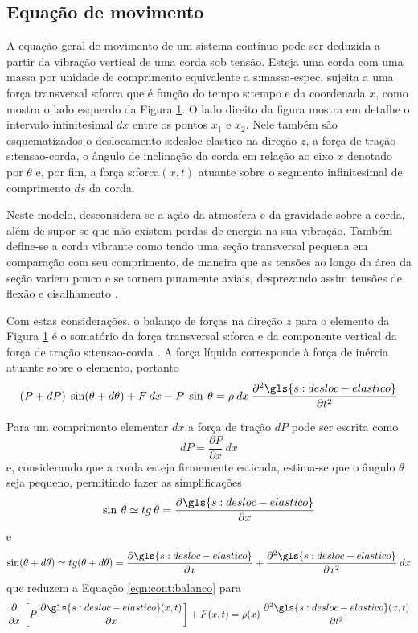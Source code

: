 \documentclass[12pt,oneside,english,brazil,lmodern,siglas,simbolos,cite=num]{ucsmonograph}
\begin{document}
	\subsection{Equação de movimento}
	A equação geral de movimento de um sistema contínuo pode ser deduzida a partir da vibração vertical de uma corda sob tensão.
	Esteja uma corda com uma massa por unidade de comprimento equivalente a \gls{s:massa-espec}, sujeita a uma força transversal \gls{s:forca} que é função do tempo \gls{s:tempo} e da coordenada $x$, como mostra o lado esquerdo da Figura \ref{fig:vibracao-corda}.
	O lado direito da figura mostra em detalhe o intervalo infinitesimal $dx$ entre os pontos $x_1$ e $x_2$.
	Nele também são esquematizados o deslocamento \gls{s:desloc-elastico} na direção $z$, a força de tração \gls{s:tensao-corda}, o ângulo de inclinação da corda em relação ao eixo $x$ denotado por $ \theta $ e, por fim, a força \gls{s:forca}$(x,t)$ atuante sobre o segmento infinitesimal de comprimento $ds$ da corda.
	\begin{figure}[t] 
	 \label{fig:vibracao-corda}
	\end{figure}

	Neste modelo, desconsidera-se a ação da atmosfera e da gravidade sobre a corda, além de supor-se que não existem perdas de energia na sua vibração.
	Também define-se a corda vibrante como tendo uma seção transversal pequena em comparação com seu comprimento, de maneira que as tensões ao longo da área da seção variem pouco e se tornem puramente axiais, desprezando assim tensões de flexão e cisalhamento \cite{clark:1972}.
	
	Com estas considerações, o balanço de forças na direção $z$ para o elemento da Figura \ref{fig:vibracao-corda} é o somatório da força transversal \gls{s:forca} e da componente vertical da força de tração \gls{s:tensao-corda} \cite{rao:2008}.
	A força líquida corresponde à força de inércia atuante sobre o elemento, portanto
	\begin{equation} \label{eqn:cont:balanco}
		(P + dP)\;\sin(\theta + d\theta) + F\:dx - P\;\sin\:\theta =
		\rho\:dx\:\frac{\partial^2 \gls{s:desloc-elastico}}
		{\partial t^2}
	\end{equation}
	
	Para um comprimento elementar $dx$ a força de tração $dP$ pode ser escrita como \[dP = \frac{\partial P}{\partial x}\:dx\] e, considerando que a corda esteja firmemente esticada, estima-se que o ângulo $ \theta $ seja pequeno, permitindo fazer as simplificações \[\sin\:\theta \simeq tg\:\theta = \frac{\partial \gls{s:desloc-elastico}}{\partial x} \] e \[\sin(\theta + d\theta) \simeq tg(\theta + d\theta) = \frac{\partial \gls{s:desloc-elastico}}{\partial x} + \frac{\partial^2 \gls{s:desloc-elastico}}{\partial x^2}\:dx \] que reduzem a Equação \ref{eqn:cont:balanco} para \[\frac{\partial}{\partial x}\,\left[P\:\frac{\partial \gls{s:desloc-elastico}(x,t)}{\partial x}\right] + F(x,t) = \rho(x)\:\frac{\partial^2 \gls{s:desloc-elastico}(x,t)}{\partial t^2} \]
	
\end{document}
